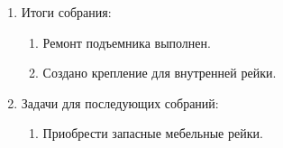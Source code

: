 \begin{enumerate}
\begin{enumerate}
    \end{enumerate}
    
	\item Итоги собрания: \newline
	\begin{enumerate}
	  \item Ремонт подъемника выполнен.\newline
	  
      \item Создано крепление для внутренней рейки.\newline
      
    \end{enumerate}
    
	\item Задачи для последующих собраний:\newline
	\begin{enumerate}
	  \item Приобрести запасные мебельные рейки.\newline
	  
    \end{enumerate}     
\end{enumerate}

\fillpage
